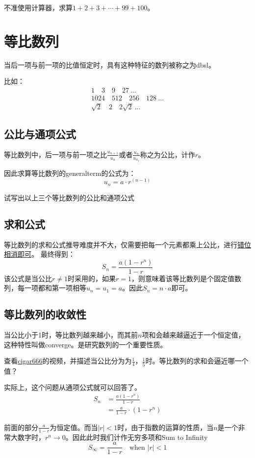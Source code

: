 \begin{TaskBox}
不准使用计算器，求算$1+2+3+\cdots +99 +100$。
\end{TaskBox}
\clearpage


\section{等比数列}
\label{sec:Geometric Progression}
当后一项与前一项的比值恒定时，具有这种特征的数列被称之为\gls{dbsl}。

比如：
\begin{align*}
1\quad 3\quad 9\quad 27 \  \ldots \\
1024\quad 512 \quad 256\quad 128 \ \ldots \\
\sqrt 2 \quad 2 \quad 2\sqrt2 \ \ldots
\end{align*}

\subsection*{公比与通项公式}
\label{subsec:Common Ratio and General Term}
等比数列中，后一项与前一项之比$\frac{u_{n+1}}{u_n}$或者$\frac{u_{n}}{u_{n_1}}$称之为公比，计作$r$。

因此求算等比数列的\gls{generalterm}的公式为：
\[
	u_n=a\cdot r^{(n-1)}
\]

\begin{TaskBox}
试写出以上三个等比数列的公比和通项公式
\end{TaskBox}


\subsection*{求和公式}
等比数列的求和公式推导难度并不大，仅需要把每一个元素都乘上公比，进行\href{https://www.cuemath.com/algebra/sum-of-a-gp/}{错位相消即可}。
最终得到：
\[
	S_n=\frac{a(1-r^n)}{1-r}
\]
该公式是当公比$r\neq1$时采用的，如果$r=1$，则意味着该等比数列是个固定值数列，每一项都和第一项相等$u_n=u_1=a$。因此$S_n=n\cdot a$即可。

\subsection*{等比数列的收敛性}
\label{subsec:Convergence of GP}
当公比小于1时，等比数列越来越小，而其前$n$项和会越来越逼近于一个恒定值，这种特性叫做\gls{converge}。是研究数列的一个重要性质。

\begin{TaskBox}
查看\href{https://www.bilibili.com/video/BV1eJ411z78q}{cigar666}的视频，并描述当公比分为为$\frac{1}{4}$，$\frac{1}{5}$时。等比数列的求和会逼近哪一个值？
\end{TaskBox}

实际上，这个问题从通项公式就可以回答了。
\begin{align*}
S_n &= \frac{a(1-r^n)}{1-r}\\
 	&=\frac{a}{1-r} \cdot (1-r^n)
\end{align*}

前面的部分$\frac{a}{1-r}$为恒定值。而当$|r|<1$时，由于指数的运算的性质，当$n$是一个非常大数字时，$r^n\to 0$。因此此时我们计作无穷多项和Sum to Infinity
\[
	S_{\infty} = \frac{a}{1-r}  \quad \text{when } |r|<1
\]